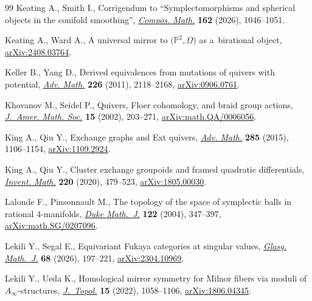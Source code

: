 \documentclass[10pt,a4paper]{amsart}
\theoremstyle{definition}
\numberwithin{equation}{section}
\begin{document}
\begin{thebibliography}{99}
Keating A., Smith I., Corrigendum to ``Symplectomorphisms and spherical objects
 in the conifold smoothing'',
 \href{https://doi.org/10.1017/S0010437X26103297}{\textit{Compos. Math.}}
 \textbf{162} (2026), 1046--1051.

Keating A., Ward A., A universal mirror to $\bigl(\mathbb{P}^2,\Omega\bigr)$ as
 a~birational object,
 \href{http://arxiv.org/abs/2408.03764}{arXiv:2408.03764}.

Keller B., Yang D., Derived equivalences from mutations of quivers with
 potential, \href{https://doi.org/10.1016/j.aim.2010.09.019}{\textit{Adv.
 Math.}} \textbf{226} (2011), 2118--2168,
 \href{http://arxiv.org/abs/0906.0761}{arXiv:0906.0761}.

Khovanov M., Seidel P., Quivers, {F}loer cohomology, and braid group actions,
 \href{https://doi.org/10.1090/S0894-0347-01-00374-5}{\textit{J.~Amer. Math.
 Soc.}} \textbf{15} (2002), 203--271,
 \href{http://arxiv.org/abs/math.QA/0006056}{arXiv:math.QA/0006056}.

King A., Qiu Y., Exchange graphs and {E}xt quivers,
 \href{https://doi.org/10.1016/j.aim.2015.08.017}{\textit{Adv. Math.}}
 \textbf{285} (2015), 1106--1154,
 \href{http://arxiv.org/abs/1109.2924}{arXiv:1109.2924}.

King A., Qiu Y., Cluster exchange groupoids and framed quadratic differentials,
 \href{https://doi.org/10.1007/s00222-019-00932-y}{\textit{Invent. Math.}}
 \textbf{220} (2020), 479--523,
 \href{http://arxiv.org/abs/1805.00030}{arXiv:1805.00030}.

Lalonde F., Pinsonnault M., The topology of the space of symplectic balls in
 rational 4-manifolds,
 \href{https://doi.org/10.1215/S0012-7094-04-12223-7}{\textit{Duke Math.~J.}}
 \textbf{122} (2004), 347--397,
 \href{http://arxiv.org/abs/math.SG/0207096}{arXiv:math.SG/0207096}.

Lekili Y., Segal E., Equivariant {F}ukaya categories at singular values,
 \href{https://doi.org/10.1017/s0017089525100487}{\textit{Glasg. Math.~J.}}
 \textbf{68} (2026), 197--221,
 \href{http://arxiv.org/abs/2304.10969}{arXiv:2304.10969}.

Lekili Y., Ueda K., Homological mirror symmetry for {M}ilnor fibers via moduli
 of {$A_\infty$}-structures,
 \href{https://doi.org/10.1112/topo.12248}{\textit{J.~Topol.}} \textbf{15}
 (2022), 1058--1106, \href{http://arxiv.org/abs/1806.04345}{arXiv:1806.04345}.


\end{thebibliography}
\end{document}

